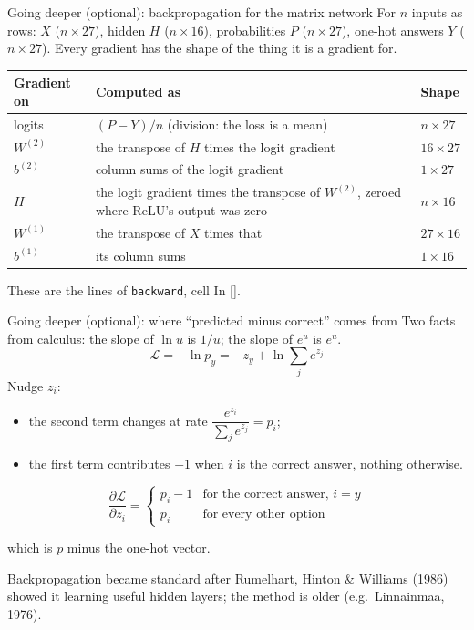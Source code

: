 \documentclass[aspectratio=169,11pt,t,\primeropts]{beamer}
\begin{document}
\begin{frame}{Going deeper (optional): backpropagation for the matrix network}
  For $n$ inputs as rows: $X$ ($n \times 27$), hidden $H$ ($n \times 16$), probabilities $P$
  ($n \times 27$), one-hot answers $Y$ ($n \times 27$). Every gradient has the shape of the thing
  it is a gradient for.
  \vspace{2mm}
  \begin{center}\small
  \begin{tabular}{@{}lL{0.62\textwidth}l@{}}
    \toprule
    \textbf{Gradient on} & \textbf{Computed as} & \textbf{Shape}\\
    \midrule
    logits & $(P - Y)/n$ (division: the loss is a mean) & $n \times 27$\\
    $W^{(2)}$ & the transpose of $H$ times the logit gradient & $16 \times 27$\\
    $b^{(2)}$ & column sums of the logit gradient & $1 \times 27$\\
    $H$ & the logit gradient times the transpose of $W^{(2)}$, zeroed where ReLU's output was zero & $n \times 16$\\
    $W^{(1)}$ & the transpose of $X$ times that & $27 \times 16$\\
    $b^{(1)}$ & its column sums & $1 \times 16$\\
    \bottomrule
  \end{tabular}
  \end{center}
  \vspace{2mm}
  {\small These are the lines of \texttt{backward}, cell In [].}
\end{frame}

\begin{frame}{Going deeper (optional): where ``predicted minus correct'' comes from}
  Two facts from calculus: the slope of $\ln u$ is $1/u$; the slope of $e^u$ is $e^u$.
  \pause
  \[
    \mathcal{L} = -\ln p_y = -z_y + \ln \sum_j e^{z_j}
  \]
  \pause
  Nudge $z_i$:
  \begin{itemize}
    \item the second term changes at rate $\dfrac{e^{z_i}}{\sum_j e^{z_j}} = p_i$;
    \item the first term contributes $-1$ when $i$ is the correct answer, nothing otherwise.
  \end{itemize}
  \pause
  \[
    \frac{\partial\mathcal{L}}{\partial z_i} =
    \begin{cases} p_i - 1 & \text{for the correct answer, } i = y\\ p_i & \text{for every other option} \end{cases}
  \]
  \vspace{-1mm}
  \begin{center}which is $p$ minus the one-hot vector.\end{center}
  {\small\color{primerMuted}Backpropagation became standard after Rumelhart, Hinton \& Williams
  (1986) showed it learning useful hidden layers; the method is older (e.g.\ Linnainmaa, 1976).}
\end{frame}
\end{document}
